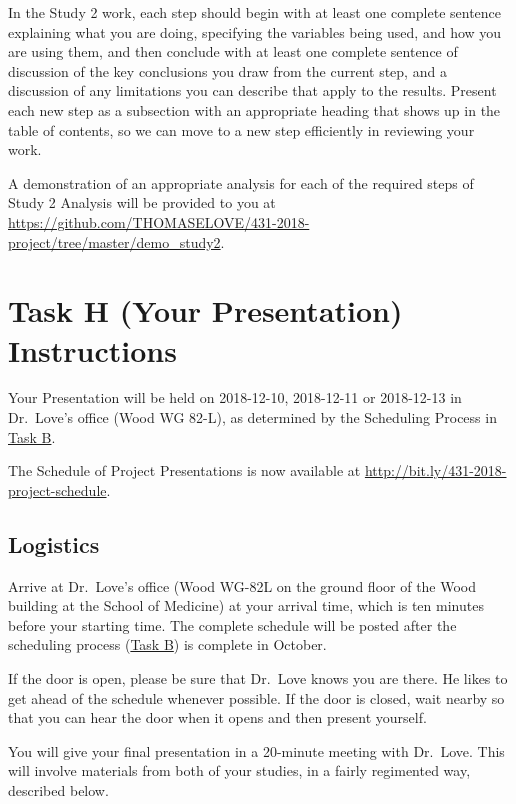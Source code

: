 \documentclass[]{book}
\theoremstyle{definition}
\theoremstyle{definition}
\theoremstyle{definition}
\theoremstyle{remark}
\begin{document}
In the Study 2 work, each step should begin with at least one complete
sentence explaining what you are doing, specifying the variables being
used, and how you are using them, and then conclude with at least one
complete sentence of discussion of the key conclusions you draw from the
current step, and a discussion of any limitations you can describe that
apply to the results. Present each new step as a subsection with an
appropriate heading that shows up in the table of contents, so we can
move to a new step efficiently in reviewing your work.

A demonstration of an appropriate analysis for each of the required
steps of Study 2 Analysis will be provided to you at
\url{https://github.com/THOMASELOVE/431-2018-project/tree/master/demo_study2}.

\hypertarget{taskH}{%
\chapter{Task H (Your Presentation) Instructions}\label{taskH}}

Your Presentation will be held on 2018-12-10, 2018-12-11 or 2018-12-13
in Dr.~Love's office (Wood WG 82-L), as determined by the Scheduling
Process in \protect\hyperlink{taskB}{Task B}.

The Schedule of Project Presentations is now available at
\url{http://bit.ly/431-2018-project-schedule}.

\hypertarget{logistics}{%
\section{Logistics}\label{logistics}}

Arrive at Dr.~Love's office (Wood WG-82L on the ground floor of the Wood
building at the School of Medicine) at your arrival time, which is ten
minutes before your starting time. The complete schedule will be posted
after the scheduling process (\protect\hyperlink{taskB}{Task B}) is
complete in October.

If the door is open, please be sure that Dr.~Love knows you are there.
He likes to get ahead of the schedule whenever possible. If the door is
closed, wait nearby so that you can hear the door when it opens and then
present yourself.

You will give your final presentation in a 20-minute meeting with
Dr.~Love. This will involve materials from both of your studies, in a
fairly regimented way, described below.
\end{document}
